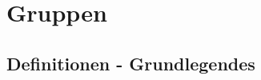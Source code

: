 \documentclass[11pt,twoside]{memoir}
\begin{document}
	
\frontmatter
\maketitle
\tableofcontents*


\mainmatter
\chapter{Gruppen}
\section{Definitionen - Grundlegendes}
\end{document}
